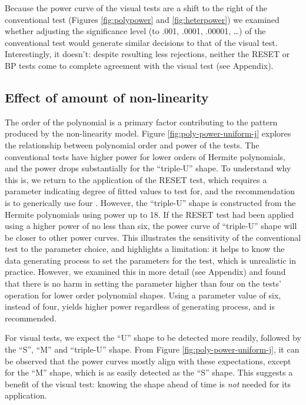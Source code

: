\documentclass[]{interact}
\theoremstyle{plain}%
\theoremstyle{definition}
\theoremstyle{remark}
\begin{document}
Because the power curve of the visual tests are a shift to the right of
the conventional test (Figures \ref{fig:polypower} and
\ref{fig:heterpower}) we examined whether adjusting the significance
level (to .001, .0001, .00001, \ldots) of the conventional test would
generate similar decisions to that of the visual test. Interestingly, it
doesn't: despite resulting less rejections, neither the RESET or BP
tests come to complete agreement with the visual test (see Appendix).

\hypertarget{effect-of-amount-of-non-linearity}{%
\subsection{\texorpdfstring{Effect of amount of
non-linearity\label{nonlin-analysis}}{Effect of amount of non-linearity}}\label{effect-of-amount-of-non-linearity}}

The order of the polynomial is a primary factor contributing to the
pattern produced by the non-linearity model. Figure
\ref{fig:poly-power-uniform-j} explores the relationship between
polynomial order and power of the tests. The conventional tests have
higher power for lower orders of Hermite polynomials, and the power
drops substantially for the ``triple-U'' shape. To understand why this
is, we return to the application of the RESET test, which requires a
parameter indicating degree of fitted values to test for, and the
recommendation is to generically use four \citep{ramsey1969tests}.
However, the ``triple-U'' shape is constructed from the Hermite
polynomials using power up to 18. If the RESET test had been applied
using a higher power of no less than six, the power curve of
``triple-U'' shape will be closer to other power curves. This
illustrates the sensitivity of the conventional test to the parameter
choice, and highlights a limitation: it helps to know the data
generating process to set the parameters for the test, which is
unrealistic in practice. However, we examined this in more detail (see
Appendix) and found that there is no harm in setting the parameter
higher than four on the tests' operation for lower order polynomial
shapes. Using a parameter value of six, instead of four, yields higher
power regardless of generating process, and is recommended.

For visual tests, we expect the ``U'' shape to be detected more readily,
followed by the ``S'', ``M'' and ``triple-U'' shape. From Figure
\ref{fig:poly-power-uniform-j}, it can be observed that the power curves
mostly align with these expectations, except for the ``M'' shape, which
is as easily detected as the ``S'' shape. This suggests a benefit of the
visual test: knowing the shape ahead of time is \emph{not} needed for
its application.
\end{document}
